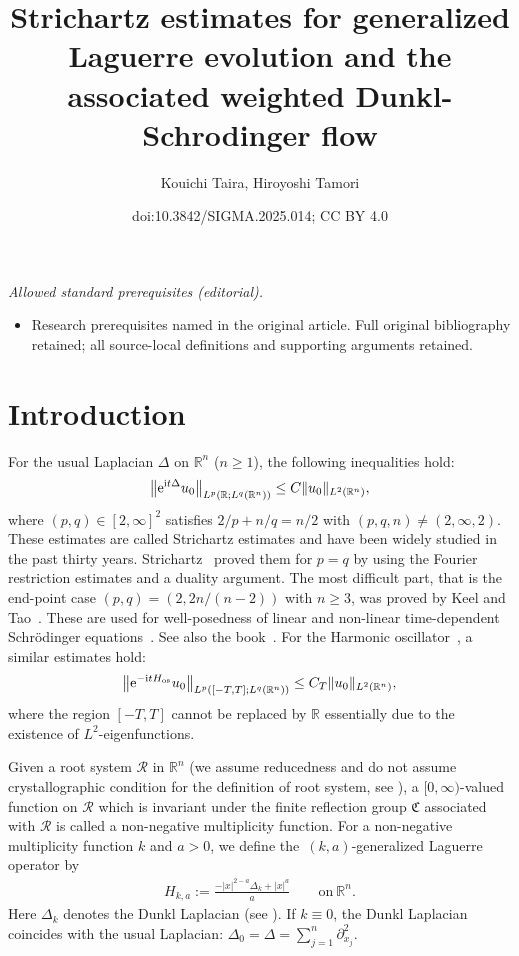 \documentclass[10pt,a4paper]{amsart}
\title{Strichartz estimates for generalized Laguerre evolution and the associated weighted Dunkl-Schrodinger flow}
\author{Kouichi Taira, Hiroyoshi Tamori}
\date{doi:10.3842/SIGMA.2025.014; CC BY 4.0}
\numberwithin{equation}{section}
\def\R{\mathbb{R}}%
\def\pa{\partial}
\newcommand{\cR}{\mathcal{R}}
\begin{document}
\maketitle
\noindent\textit{Allowed standard prerequisites (editorial).}\begin{itemize}
\item Research prerequisites named in the original article. Full original bibliography retained; all source-local definitions and supporting arguments retained.
\end{itemize}\medskip
\section{Introduction}

For the usual Laplacian $\Delta$ on $\R^n$ ($n\ge 1$), the following inequalities hold:
\begin{align*}
\big\|{\rm e}^{{\rm i}t\Delta}u_0\big\|_{L^p(\R;L^q(\R^n))}\leq C\|u_0\|_{L^2(\R^n)},
\end{align*}
where $(p,q)\in [2,\infty]^2$ satisfies $2/p+n/q=n/2$ with $(p,q,n)\neq (2,\infty,2)$. These estimates are called Strichartz estimates and have been widely studied in the past thirty years. Strichartz~\cite{St} proved them for $p=q$ by using the Fourier restriction estimates and a duality argument. The most difficult part, that is the end-point case $(p,q)=(2,2n/(n-2))$ with $n\geq 3$, was proved by Keel and Tao~\cite{KT}.
These are used for well-posedness of linear and non-linear time-dependent Schr\"odinger equations~\cite{GV,Y}. See also the book~\cite{T}. For the Harmonic oscillator~, a similar estimates hold:
\[
\big\|{\rm e}^{-{\rm i}tH_{\rm os}}u_0\big\|_{L^p([-T,T];L^q(\R^n))}\leq C_T\|u_0\|_{L^2(\R^n)},
\]
 where the region $[-T,T]$ cannot be replaced by $\R$ essentially due to the existence of $L^2$-eigenfunctions.

Given a root system $\cR$ in $\R^n$ (we assume reducedness and do not assume crystallographic condition for the definition of root system, see \cite[Definition~2.1]{BKO}), a $[0,\infty)$-valued function on $\cR$ which is invariant under the finite reflection group $\mathfrak{C}$ associated with $\cR$ is called a non-negative multiplicity function.
For a non-negative multiplicity function $k$ and $a>0$, we define the~$(k,a)$-generalized Laguerre operator by
\begin{align*}
H_{k,a}:=\frac{-|x|^{2-a}\Delta_k+|x|^a}{a}\qquad \text{on} \ \R^n.
\end{align*}
Here $\Delta_k$ denotes the Dunkl Laplacian (see \cite[formula~(2.9)]{BKO}).
If $k\equiv 0$, the Dunkl Laplacian coincides with the usual Laplacian: $\Delta_0=\Delta=\sum_{j=1}^n\pa_{x_j}^2$.
\end{document}
